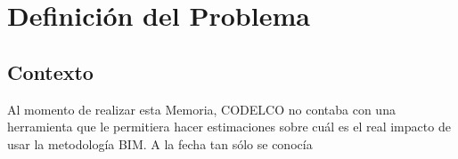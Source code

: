 \chapter{Definición del Problema}

\section{Contexto}

Al momento de realizar esta Memoria, CODELCO no contaba con una herramienta que le permitiera hacer estimaciones sobre cuál es el real impacto de usar la metodología BIM. A la fecha tan sólo se conocía